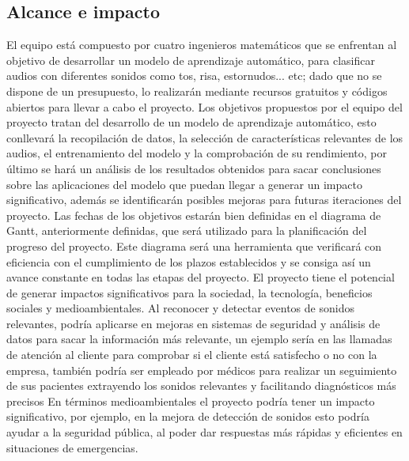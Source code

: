 \subsection{Alcance e impacto}
El equipo está compuesto por cuatro ingenieros matemáticos que se enfrentan al objetivo de desarrollar un modelo de aprendizaje automático, para clasificar audios con diferentes sonidos como tos, risa, estornudos... etc; dado que no se dispone de un presupuesto, lo realizarán mediante recursos gratuitos y códigos abiertos para llevar a cabo el proyecto.
Los objetivos propuestos por el equipo del proyecto tratan del desarrollo de un modelo de aprendizaje automático, esto conllevará la recopilación de datos, la selección de características relevantes de los audios, el entrenamiento del modelo y la comprobación de su rendimiento, por último se hará un análisis de los resultados obtenidos para sacar conclusiones sobre las aplicaciones del modelo que puedan llegar a generar un impacto significativo, además se identificarán posibles mejoras para futuras iteraciones del proyecto.
Las fechas de los objetivos estarán bien definidas en el diagrama de Gantt, anteriormente definidas, que será utilizado para la planificación del progreso del proyecto. Este diagrama será una herramienta que verificará con eficiencia con el cumplimiento de los plazos establecidos y se consiga así un avance constante en todas las etapas del proyecto.
El proyecto tiene el potencial de generar impactos significativos para la sociedad, la tecnología, beneficios sociales y medioambientales. Al reconocer y detectar eventos de sonidos relevantes, podría aplicarse en mejoras en sistemas de seguridad y análisis de datos para sacar la información más relevante, un ejemplo sería en las llamadas de atención al cliente para comprobar si el cliente está satisfecho o no con la empresa, también podría ser empleado por médicos para realizar un seguimiento de sus pacientes extrayendo los sonidos relevantes y facilitando diagnósticos más precisos
En términos medioambientales el proyecto podría tener un impacto significativo, por ejemplo, en la mejora de detección de sonidos esto podría ayudar a la seguridad pública, al poder dar respuestas más rápidas y eficientes en situaciones de emergencias.
